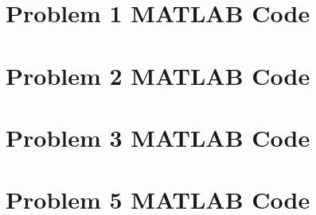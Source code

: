 \documentclass[../main.tex]{subfiles}
\begin{document}
	\begin{appendices}
		\section{Problem 1 MATLAB Code}
		\label{Problem1MATLAB}
		
		\newpage

		\section{Problem 2 MATLAB Code}
		\label{Problem2MATLAB}
		
		\newpage
		
		\section{Problem 3 MATLAB Code}
		\label{Problem3MATLAB}
		
		\newpage

		\section{Problem 5 MATLAB Code}
		\label{Problem5MATLAB}
		
		\newpage
	\end{appendices}
\end{document}

